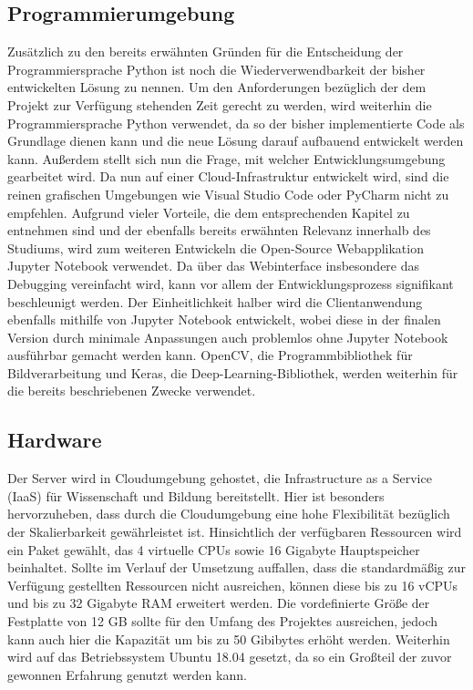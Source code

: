 \documentclass[12pt, a4paper]{report}
\begin{document}
\subsection{Programmierumgebung}
Zusätzlich zu den bereits erwähnten Gründen für die Entscheidung der Programmiersprache Python ist noch die Wiederverwendbarkeit der bisher entwickelten Lösung zu nennen. Um den Anforderungen bezüglich der dem Projekt zur Verfügung stehenden Zeit gerecht zu werden, wird weiterhin die Programmiersprache Python verwendet, da so der bisher implementierte Code als Grundlage dienen kann und die neue Lösung darauf aufbauend entwickelt werden kann. Außerdem stellt sich nun die Frage, mit welcher Entwicklungsumgebung gearbeitet wird. Da nun auf einer Cloud-Infrastruktur entwickelt wird, sind die reinen grafischen Umgebungen wie Visual Studio Code oder PyCharm nicht zu empfehlen. Aufgrund vieler Vorteile, die dem entsprechenden Kapitel zu entnehmen sind und der ebenfalls bereits erwähnten Relevanz innerhalb des Studiums, wird zum weiteren Entwickeln die Open-Source Webapplikation Jupyter Notebook verwendet. Da über das Webinterface insbesondere das Debugging vereinfacht wird, kann vor allem der Entwicklungsprozess signifikant beschleunigt werden. Der Einheitlichkeit halber wird die Clientanwendung ebenfalls mithilfe von Jupyter Notebook entwickelt, wobei diese in der finalen Version durch minimale Anpassungen auch problemlos ohne Jupyter Notebook ausführbar gemacht werden kann. OpenCV, die Programmbibliothek für Bildverarbeitung und Keras, die Deep-Learning-Bibliothek, werden weiterhin für die bereits beschriebenen Zwecke verwendet.

\subsection{Hardware}
Der Server wird in Cloudumgebung gehostet, die Infrastructure as a Service (IaaS) für Wissenschaft und Bildung bereitstellt. Hier ist besonders hervorzuheben, dass durch die Cloudumgebung eine hohe Flexibilität bezüglich der Skalierbarkeit gewährleistet ist. Hinsichtlich der verfügbaren Ressourcen wird ein Paket gewählt, das 4 virtuelle CPUs sowie 16 Gigabyte Hauptspeicher beinhaltet. Sollte im Verlauf der Umsetzung auffallen, dass die standardmäßig zur Verfügung gestellten Ressourcen nicht ausreichen, können diese bis zu 16 vCPUs und bis zu 32 Gigabyte RAM erweitert werden. Die vordefinierte Größe der Festplatte von 12 GB sollte für den Umfang des Projektes ausreichen, jedoch kann auch hier die Kapazität um bis zu 50 Gibibytes erhöht werden. Weiterhin wird auf das Betriebssystem Ubuntu 18.04 gesetzt, da so ein Großteil der zuvor gewonnen Erfahrung genutzt werden kann.
\end{document}
